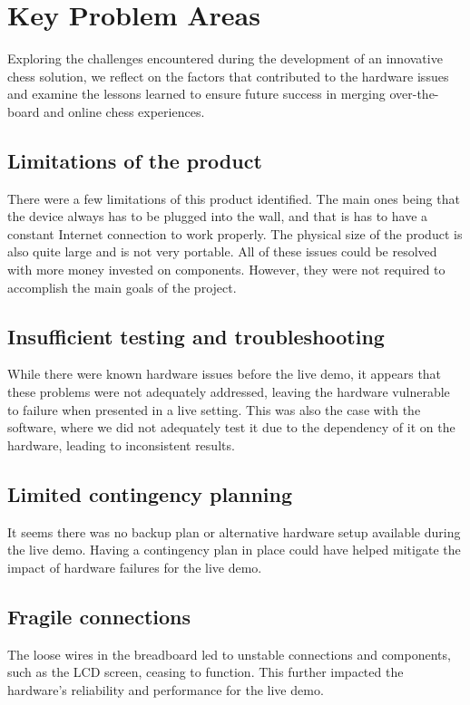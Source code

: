 \documentclass{article}
\begin{document}
\section{Key Problem Areas}
 
Exploring the challenges encountered during the development of an innovative chess solution, we reflect on the factors that contributed to the hardware issues and examine the lessons learned to ensure future success in merging over-the-board and online chess experiences.

\subsection{Limitations of the product}
There were a few limitations of this product identified. The main ones being that the device always has to be plugged into the wall, and that is has to have a constant Internet connection to work properly. The physical size of the product is also 
quite large and is not very portable. All of these issues could be resolved with more money invested on components. However, they were not required to accomplish the main goals of the project.

\subsection{Insufficient testing and troubleshooting}
While there were known hardware issues before the live demo, it appears that these problems were not adequately addressed, leaving the hardware vulnerable to failure when presented in a live setting.
This was also the case with the software, where we did not adequately test it due to the dependency of it on the hardware, leading to inconsistent results.

\subsection{Limited contingency planning}
It seems there was no backup plan or alternative hardware setup available during the live demo. Having a contingency plan in place could have helped mitigate the impact of hardware failures for the live demo.

\subsection{Fragile connections}
The loose wires in the breadboard led to unstable connections and components, such as the LCD screen, ceasing to function. This further impacted the hardware's reliability and performance for the live demo.
\end{document}
